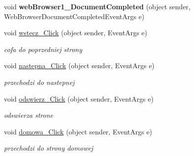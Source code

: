 \begin{DoxyCompactItemize}
\item 
\mbox{\label{class_proj__przegladarka_1_1_form1_afdfb6a48cc7ac12d50b71f8004b81019}} 
void {\bfseries web\+Browser1\+\_\+\+Document\+Completed} (object sender, Web\+Browser\+Document\+Completed\+Event\+Args e)
\item 
\mbox{\label{class_proj__przegladarka_1_1_form1_a888a20231ffbdd024cd246998da0cbf2}} 
void \mbox{\hyperlink{class_proj__przegladarka_1_1_form1_a888a20231ffbdd024cd246998da0cbf2}{wstecz\+\_\+\+Click}} (object sender, Event\+Args e)
\begin{DoxyCompactList}\small\item\em cofa do poprzedniej strony \end{DoxyCompactList}\item 
\mbox{\label{class_proj__przegladarka_1_1_form1_ae8a857f58610519c9a960db93d41d52b}} 
void \mbox{\hyperlink{class_proj__przegladarka_1_1_form1_ae8a857f58610519c9a960db93d41d52b}{nastepna\+\_\+\+Click}} (object sender, Event\+Args e)
\begin{DoxyCompactList}\small\item\em przechodzi do nastepnej \end{DoxyCompactList}\item 
\mbox{\label{class_proj__przegladarka_1_1_form1_a07b2e8784740c062545be09e18a7a8af}} 
void \mbox{\hyperlink{class_proj__przegladarka_1_1_form1_a07b2e8784740c062545be09e18a7a8af}{odswierz\+\_\+\+Click}} (object sender, Event\+Args e)
\begin{DoxyCompactList}\small\item\em odswierza strone \end{DoxyCompactList}\item 
\mbox{\label{class_proj__przegladarka_1_1_form1_acc2b7f6294fec25326b86c263b341d09}} 
void \mbox{\hyperlink{class_proj__przegladarka_1_1_form1_acc2b7f6294fec25326b86c263b341d09}{domowa\+\_\+\+Click}} (object sender, Event\+Args e)
\begin{DoxyCompactList}\small\item\em przechodzi do strony domowej \end{DoxyCompactList}\item 

\end{DoxyCompactItemize}
